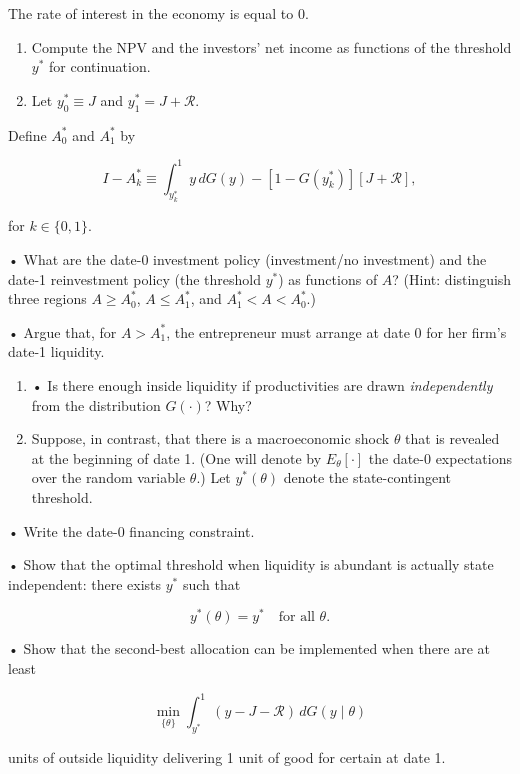 \documentclass[11pt,a4paper]{article}
\begin{document}
The rate of interest in the economy is equal to 0.

\begin{enumerate}
\def\labelenumi{(\roman{enumi})}
\item
  Compute the NPV and the investors' net income as functions of the threshold \(y^*\) for
  continuation.
\item
  Let \(y_0^* \equiv J\) and \(y_1^* = J + \mathcal{R}\).
\end{enumerate}

Define \(A_0^*\) and \(A_1^*\) by

\[I - A_k^* \equiv \int_{y_k^*}^1 y\,dG(y) - [1 - G(y_k^*)][J + \mathcal{R}],\]

for \(k \in \{0, 1\}\).

• What are the date-0 investment policy (investment/no investment) and the date-1 reinvestment
policy (the threshold \(y^*\)) as functions of \(A\)? (Hint: distinguish three regions
\(A \geqslant A_0^*\), \(A \leqslant A_1^*\), and \(A_1^* < A < A_0^*\).)

• Argue that, for \(A > A_1^*\), the entrepreneur must arrange at date 0 for her firm's date-1
liquidity.

\begin{enumerate}
\def\labelenumi{(\roman{enumi})}
\setcounter{enumi}{2}
\item
  • Is there enough inside liquidity if productivities are drawn \emph{independently} from the
  distribution \(G(\cdot)\)? Why?
\item
  Suppose, in contrast, that there is a macroeconomic shock \(\theta\) that is revealed at the
  beginning of date 1. (One will denote by \(E_\theta[\cdot]\) the date-0 expectations over the
  random variable \(\theta\).) Let \(y^*(\theta)\) denote the state-contingent threshold.
\end{enumerate}

• Write the date-0 financing constraint.

• Show that the optimal threshold when liquidity is abundant is actually state independent: there
exists \(y^*\) such that

\[y^*(\theta) = y^* \quad\text{for all } \theta.\]

• Show that the second-best allocation can be implemented when there are at least

\[\min_{\{\theta\}} \int_{y^*}^1 (y - J - \mathcal{R})\,dG(y \mid \theta)\]

units of outside liquidity delivering 1 unit of good for certain at date 1.
\end{document}
